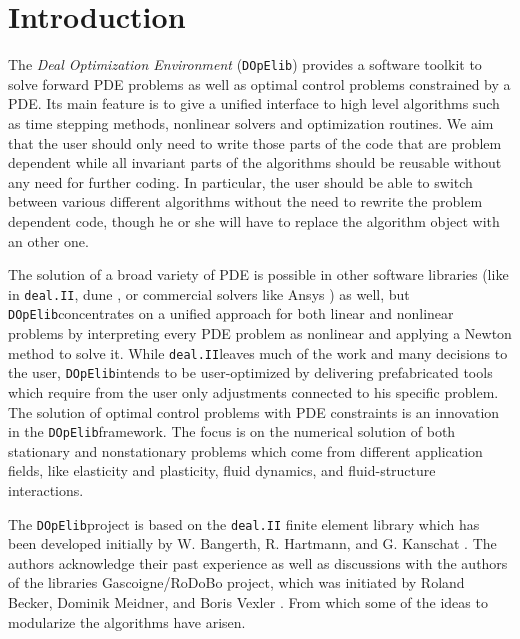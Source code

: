 \documentclass[prodmode,acmtoms]{acmsmall}
\numberwithin{equation}{section}
\newcommand{\deal}{\texttt{deal.II}}
\newcommand{\dope}{\texttt{DOpElib}}
\begin{document}
\section{Introduction}
\label{introduction}
The \textit{Deal Optimization Environment} (\dope) 
provides a software toolkit to solve forward PDE
problems as well as optimal control problems constrained by a PDE. 
Its main feature is to give a unified interface to high level algorithms such as 
time stepping methods, nonlinear solvers and optimization routines. 
We aim that the user should only need to write those parts
of the code that are problem dependent while all invariant parts of the algorithms
should be reusable without any need for further coding.
In particular, the user should be able to switch between various different 
algorithms without the need to rewrite the problem dependent code, though he or she will
have to replace the algorithm object with an other one. 

The
solution of a broad variety of PDE is possible in other software
libraries (like in \deal \cite{deal}, dune \cite{dune} , 
or commercial solvers like Ansys \cite{ansys}) 
as well, but
\dope concentrates on a unified approach for both linear and nonlinear
problems by interpreting every PDE problem as nonlinear and applying a
Newton method to solve it. While \deal leaves much of the work and many
decisions to the user, \dope intends to be user-optimized by delivering
prefabricated tools which require from the user only adjustments connected
to his specific problem. The solution of optimal control problems with PDE
constraints is an innovation in the \dope framework.
The focus is on the numerical solution of both stationary and nonstationary
problems which come from different application fields, like elasticity and
plasticity, fluid dynamics, and fluid-structure interactions.

The \dope project is 
based on the \deal \cite{deal} finite element library which has been developed
 initially by W. Bangerth, R. Hartmann, and G. Kanschat \cite{deal}.
The authors acknowledge their past experience as well as discussions with 
the authors of the libraries 
Gascoigne/RoDoBo project, which was initiated by 
Roland Becker, Dominik Meidner,  and Boris Vexler \cite{rodobo}. 
From which some of the ideas to modularize the algorithms have arisen.
\end{document}
